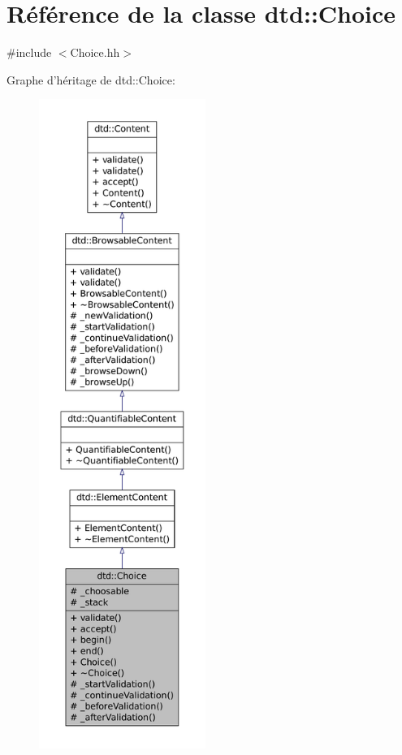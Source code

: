 \hypertarget{classdtd_1_1_choice}{
\section{Référence de la classe dtd::Choice}
\label{classdtd_1_1_choice}
}


{\ttfamily \#include $<$Choice.hh$>$}



Graphe d'héritage de dtd::Choice:\nopagebreak
\begin{figure}[H]
\begin{center}
\leavevmode
\includegraphics[height=600pt]{classdtd_1_1_choice__inherit__graph}
\end{center}
\end{figure}


